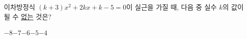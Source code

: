 이차방정식 $(k+3)x^2+2kx+k-5=0$이 실근을 가질 때, 다음 중 실수 $k$의 값이 될 수 \underline{없는} 것은?
\begin{choices32}{$-8$}{$-7$}{$-6$}{$-5$}{$-4$}\end{choices32}
